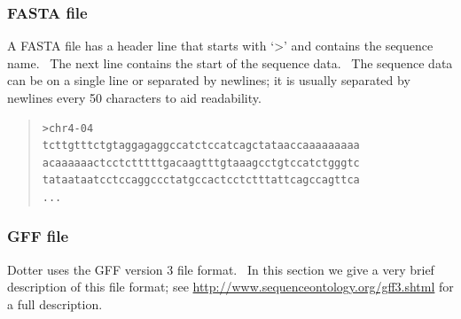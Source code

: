 \documentclass[letterpaper]{article}
\begin{document}
\bigskip

{\color[rgb]{0.30980393,0.5058824,0.7411765}\subsubsection[FASTA file]{FASTA file}}
{A FASTA file has a header line that starts with
{\textquoteleft}{\textgreater}{\textquoteright} and contains the
sequence name. \ The next line contains the start of the sequence data.
\ The sequence data can be on a single line or separated by newlines;
it is usually separated by newlines every 50 characters to aid
readability.}

\bigskip

\begin{quote}
\begin{verbatim}
>chr4-04
tcttgtttctgtaggagaggccatctccatcagctataaccaaaaaaaaa
acaaaaaactcctctttttgacaagtttgtaaagcctgtccatctgggtc
tataataatcctccaggccctatgccactcctctttattcagccagttca
...
\end{verbatim}
\end{quote}

{\color[rgb]{0.30980393,0.5058824,0.7411765}\subsubsection[GFF file]{GFF file}}
{Dotter uses the GFF version 3 file format. \ In this section we give a
very brief description of this file format; see
\url{http://www.sequenceontology.org/gff3.shtml} for a full
description.}

\bigskip
\end{document}
